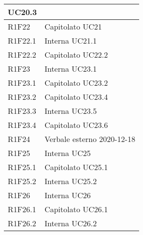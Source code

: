 \begin{center}
\begin{longtable}{|p{22mm}|p{22mm}|}
UC20.3 \newline
\\
\hline
R1F22 &
Capitolato \newline
UC21 \newline
\\
\hline
R1F22.1 &
Interna \newline
UC21.1 \newline
\\
\hline
R1F22.2 &
Capitolato \newline
UC22.2 \newline
\\
\hline
R1F23 &
Interna \newline
UC23.1 \newline
\\
\hline
R1F23.1 &
Capitolato \newline
UC23.2 \newline
\\
\hline
R1F23.2 &
Capitolato \newline
UC23.4 \newline
\\
\hline
R1F23.3 &
Interna \newline
UC23.5 \newline
\\
\hline
R1F23.4 &
Capitolato \newline
UC23.6 \newline
\\
\hline
R1F24 &
Verbale esterno 2020-12-18 \newline
\\
\hline
R1F25 &
Interna \newline
UC25 \newline
\\
\hline
R1F25.1 &
Capitolato \newline
UC25.1 \newline
\\
\hline
R1F25.2 &
Interna \newline
UC25.2 \newline
\\
\hline
R1F26 &
Interna \newline
UC26 \newline
\\
\hline
R1F26.1 &
Capitolato \newline
UC26.1 \newline
\\
\hline
R1F26.2 &
Interna \newline
UC26.2 \newline

\end{longtable}
\end{center}
